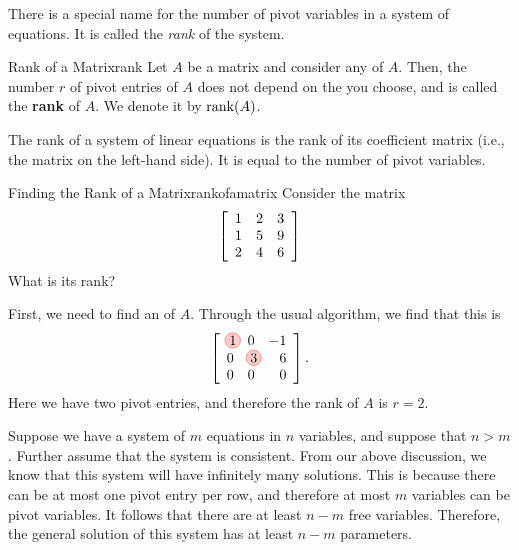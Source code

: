 There is a special name for the number of pivot variables in a system
of equations. It is called the {\em rank} of the system.

\begin{definition}{Rank of a Matrix}{rank}
  Let $A$ be a matrix and consider any {\ef} of $A$.  Then, the number
  $r$ of pivot entries of $A$ does not depend on the {\ef} you choose,
  and is called the \textbf{rank} of $A$. We denote
  it by $\mbox{rank}(A)$.

  The rank of a system of linear equations is the rank of its
  coefficient matrix (i.e., the matrix on the left-hand side).
  It is equal to the number of pivot variables.
\end{definition}

\begin{example}{Finding the Rank of a Matrix}{rankofamatrix}
Consider the matrix
\begin{equation*}
\left[
\begin{array}{rrr}
1 & 2 & 3 \\
1 & 5 & 9 \\
2 & 4 & 6 
\end{array}
\right]
\end{equation*}
What is its rank?
\end{example}

\begin{solution}
  First, we need to find an {\ef} of $A$. Through the usual algorithm,
  we find that this is
  \begin{equation*}
    \leftB
    \begin{array}{rrr}
      \circled{1} & 0 & -1 \\
      0 & \circled{3} & 6 \\
      0 & 0 & 0
    \end{array}
    \rightB.
  \end{equation*}
  Here we have two pivot entries, and therefore the rank of $A$ is
  $r=2$.
\end{solution}

Suppose we have a system of $m$ equations in $n$ variables, and
suppose that $n>m$. Further assume that the system is consistent. From
our above discussion, we know that this system will have infinitely
many solutions. This is because there can be at most one pivot entry
per row, and therefore at most $m$ variables can be pivot
variables. It follows that there are at least $n-m$ free variables.
Therefore, the general solution of this system has at least $n-m$
parameters.

